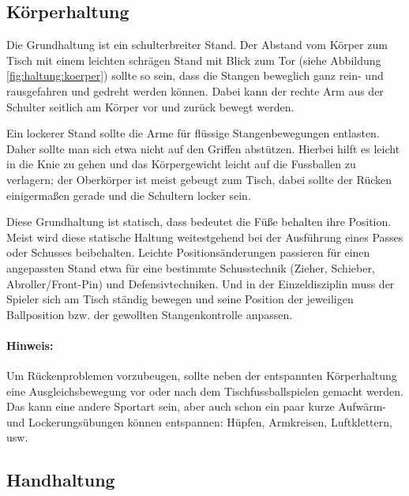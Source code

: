 \subsection{Körperhaltung}
\label{technik:haltung:koerper}

Die Grundhaltung ist ein schulterbreiter Stand.
Der Abstand vom Körper zum Tisch mit einem leichten schrägen Stand mit Blick zum Tor (siehe Abbildung \ref{fig:haltung:koerper}) sollte so sein, dass die Stangen beweglich ganz rein- und rausgefahren und gedreht werden können.
Dabei kann der rechte Arm aus der Schulter seitlich am Körper vor und zurück bewegt werden. 

Ein lockerer Stand sollte die Arme für flüssige Stangenbewegungen entlasten. 
Daher sollte man sich etwa nicht auf den Griffen abstützen.
Hierbei hilft es leicht in die Knie zu gehen und das Körpergewicht leicht auf die Fussballen zu verlagern; der Oberkörper ist meist gebeugt zum Tisch, dabei sollte der Rücken einigermaßen gerade und die Schultern locker sein.

Diese Grundhaltung ist statisch, dass bedeutet die Füße behalten ihre Position. 
Meist wird diese statische Haltung weitestgehend bei der Ausführung eines Passes oder Schusses beibehalten. 
Leichte Positionsänderungen passieren für einen angepassten Stand etwa für eine bestimmte Schusstechnik (Zieher, Schieber, Abroller/Front-Pin) und Defensivtechniken.
Und in der Einzeldisziplin muss der Spieler sich am Tisch ständig bewegen und seine Position der jeweiligen Ballposition bzw. der gewollten Stangenkontrolle anpassen.

\paragraph{Hinweis:} Um Rückenproblemen vorzubeugen, sollte neben der entspannten Körperhaltung eine Ausgleichsbewegung vor oder nach dem Tischfussballspielen gemacht werden.
Das kann eine andere Sportart sein, aber auch schon ein paar kurze Aufwärm- und Lockerungsübungen können entspannen: Hüpfen, Armkreisen, Luftklettern, usw. 

\subsection{Handhaltung}
\label{technik:haltung:griffe}

